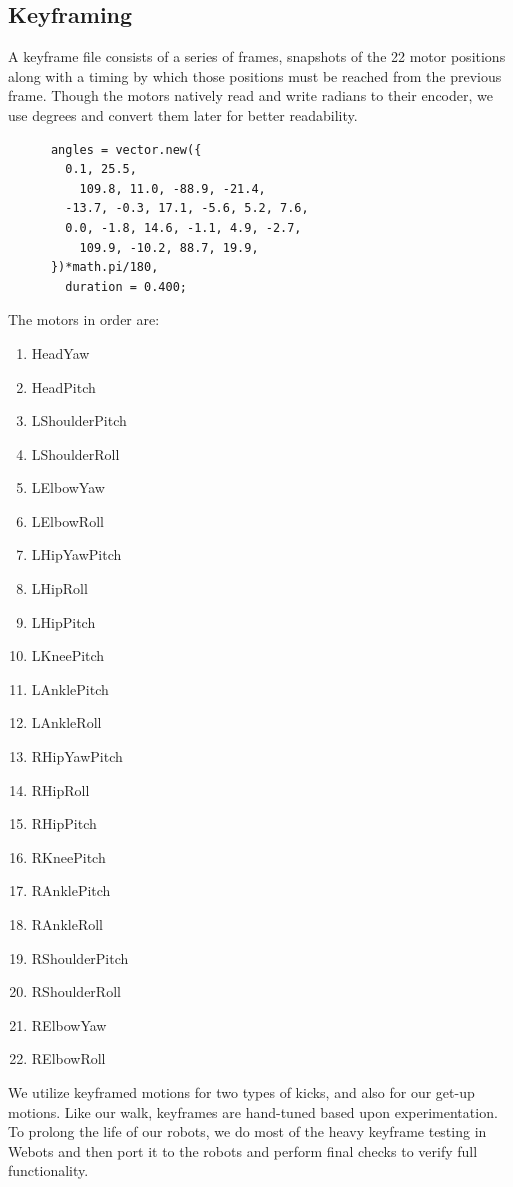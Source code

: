 \documentclass{article}
\begin{document}
  \subsection{Keyframing}
	  A keyframe file consists of a series of frames, snapshots of the 22 motor positions along with a timing by which those positions must be reached from the previous frame. Though the motors natively read and write radians to their encoder, we use degrees and convert them later for better readability.
	  \begin{lstlisting}
  	  angles = vector.new({
	  	0.1, 25.5,
		  109.8, 11.0, -88.9, -21.4,
  		-13.7, -0.3, 17.1, -5.6, 5.2, 7.6,
	  	0.0, -1.8, 14.6, -1.1, 4.9, -2.7,
		  109.9, -10.2, 88.7, 19.9,
  	  })*math.pi/180,
	    duration = 0.400;
	  \end{lstlisting}

  	The motors in order are:
	  \begin{multicols}{3}
		  \begin{enumerate}
			  \item HeadYaw
  			\item HeadPitch
	  		\item LShoulderPitch
		  	\item LShoulderRoll
			  \item LElbowYaw
  			\item LElbowRoll
	  		\item LHipYawPitch
		  	\item LHipRoll
			  \item LHipPitch
  			\item LKneePitch
	  		\item LAnklePitch
		  	\item LAnkleRoll
			  \item RHipYawPitch
  			\item RHipRoll
	  		\item RHipPitch
		  	\item RKneePitch
			  \item RAnklePitch
  			\item RAnkleRoll
	  		\item RShoulderPitch
		  	\item RShoulderRoll
			  \item RElbowYaw
  			\item RElbowRoll
	  	\end{enumerate}
  	\end{multicols}

	  We utilize keyframed motions for two types of kicks, and also for our get-up motions. Like our walk, keyframes are hand-tuned based upon experimentation. To prolong the life of our robots, we do most of the heavy keyframe testing in Webots and then port it to the robots and perform final checks to verify full functionality.
\end{document}
